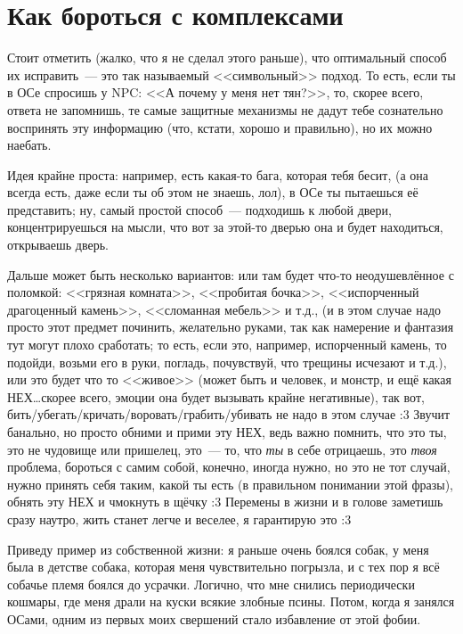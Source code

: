 \documentclass[a4paper,14pt,oneside]{memoir}
\begin{document}
\section{Как бороться с комплексами}
Стоит отметить (жалко, что я не сделал этого раньше), что оптимальный способ их исправить~--- это так называемый <<символьный>> подход. То есть, если ты в ОСе спросишь у NPC: <<А почему у меня нет тян?>>, то, скорее всего, ответа не запомнишь, те самые защитные механизмы не дадут тебе сознательно воспринять эту информацию (что, кстати, хорошо и правильно), но их можно наебать. 

Идея крайне проста: например, есть какая-то бага, которая тебя бесит, (а она всегда есть, даже если ты об этом не знаешь, лол), в ОСе ты пытаешься её представить; ну, самый простой способ~--- подходишь к любой двери, концентрируешься на мысли, что вот за этой-то дверью она и будет находиться, открываешь дверь. 

Дальше может быть несколько вариантов: или там будет что-то неодушевлённое с поломкой: <<грязная комната>>, <<пробитая бочка>>, <<испорченный драгоценный камень>>, <<сломанная мебель>> и т.д., (и в этом случае надо просто этот предмет починить, желательно руками, так как намерение и фантазия тут могут плохо сработать; то есть, если это, например, испорченный камень, то подойди, возьми его в руки, погладь, почувствуй, что трещины исчезают и т.д.), или это будет что то <<живое>> (может быть и человек, и монстр, и ещё какая НЕХ\ldots скорее всего, эмоции она будет вызывать крайне негативные), так вот, бить/убегать/кричать/воровать/грабить/убивать не надо в этом случае :3 Звучит банально, но просто обними и прими эту НЕХ, ведь важно помнить, что это ты, это не чудовище или пришелец, это~--- то, что \textit{ты} в себе отрицаешь, это \textit{твоя} проблема, бороться с самим собой, конечно, иногда нужно, но это не тот случай, нужно принять себя таким, какой ты есть (в правильном понимании этой фразы), обнять эту НЕХ и чмокнуть в щёчку :3 Перемены в жизни и в голове заметишь сразу наутро, жить станет легче и веселее, я гарантирую это :3
 
Приведу пример из собственной жизни: я раньше очень боялся собак, у меня была в детстве собака, которая меня чувствительно погрызла, и с тех пор я всё собачье племя боялся до усрачки. Логично, что мне снились периодически кошмары, где меня драли на куски всякие злобные псины. Потом, когда я занялся ОСами, одним из первых моих свершений стало избавление от этой фобии.
\end{document}
